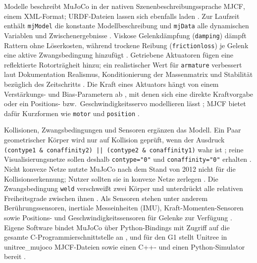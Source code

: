 Modelle beschreibt MuJoCo in der nativen Szenenbeschreibungssprache MJCF, einem XML-Format; URDF-Dateien lassen sich ebenfalls laden \cite{MujocoDoku2026a}.
Zur Laufzeit enthält \texttt{mjModel} die konstante Modellbeschreibung und \texttt{mjData} alle dynamischen Variablen und Zwischenergebnisse \cite{MujocoDoku2026a}.
Viskose Gelenkdämpfung (\texttt{damping}) dämpft Rattern ohne Löserkosten, während trockene Reibung (\texttt{frictionloss}) je Gelenk eine aktive Zwangsbedingung hinzufügt \cite{MujocoDoku2026b}.
Getriebene Aktuatoren fügen eine reflektierte Rotorträgheit hinzu; ein realistischer Wert für \texttt{armature} verbessert laut Dokumentation Realismus, Konditionierung der Massenmatrix und Stabilität bezüglich des Zeitschritts \cite{MujocoDoku2026b}.
Die Kraft eines Aktuators hängt von einem Verstärkungs- und Bias-Parametern ab \cite{MujocoDoku2026}, mit denen sich eine direkte Kraftvorgabe oder ein Positions- bzw.\ Geschwindigkeitsservo modellieren lässt \cite{MujocoDoku2026}; MJCF bietet dafür Kurzformen wie \texttt{motor} und \texttt{position} \cite{MujocoDoku2026b}.

Kollisionen, Zwangsbedingungen und Sensoren ergänzen das Modell.
Ein Paar geometrischer Körper wird nur auf Kollision geprüft, wenn der Ausdruck \texttt{(contype1 \& conaffinity2) || (contype2 \& conaffinity1)} wahr ist \cite{MujocoDoku2026}; reine Visualisierungsnetze sollen deshalb \texttt{contype="0"} und \texttt{conaffinity="0"} erhalten \cite{MujocoDoku2026b}.
Nicht konvexe Netze nutzte MuJoCo nach dem Stand von 2012 nicht für die Kollisionserkennung; Nutzer sollten sie in konvexe Netze zerlegen \cite{Todorov2012}.
Die Zwangsbedingung \texttt{weld} verschweißt zwei Körper und unterdrückt alle relativen Freiheitsgrade zwischen ihnen \cite{MujocoDoku2026}.
Als Sensoren stehen unter anderem Berührungssensoren, inertiale Messeinheiten (IMU), Kraft-Momenten-Sensoren sowie Positions- und Geschwindigkeitssensoren für Gelenke zur Verfügung \cite{MujocoDoku2026a}.
Eigene Software bindet MuJoCo über Python-Bindings mit Zugriff auf die gesamte C-Programmierschnittstelle an \cite{MujocoDoku2026a}, und für den G1 stellt Unitree in unitree\_mujoco MJCF-Dateien sowie einen C++- und einen Python-Simulator bereit \cite{UnitreeMujoco}.

